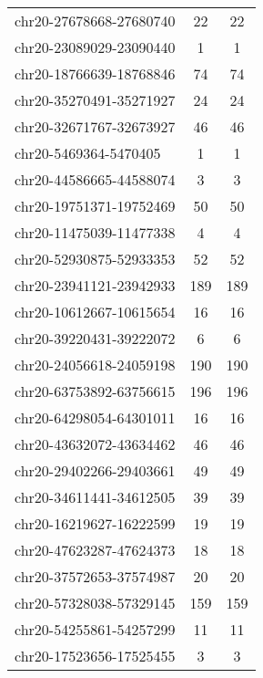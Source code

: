 \begin{longtable}{lSS}
	chr20-27678668-27680740 & 22     & 22                         \\
	chr20-23089029-23090440 & 1      & 1                          \\
	chr20-18766639-18768846 & 74     & 74                         \\
	chr20-35270491-35271927 & 24     & 24                         \\
	chr20-32671767-32673927 & 46     & 46                         \\
	chr20-5469364-5470405   & 1      & 1                          \\
	chr20-44586665-44588074 & 3      & 3                          \\
	chr20-19751371-19752469 & 50     & 50                         \\
	chr20-11475039-11477338 & 4      & 4                          \\
	chr20-52930875-52933353 & 52     & 52                         \\
	chr20-23941121-23942933 & 189    & 189                        \\
	chr20-10612667-10615654 & 16     & 16                         \\
	chr20-39220431-39222072 & 6      & 6                          \\
	chr20-24056618-24059198 & 190    & 190                        \\
	chr20-63753892-63756615 & 196    & 196                        \\
	chr20-64298054-64301011 & 16     & 16                         \\
	chr20-43632072-43634462 & 46     & 46                         \\
	chr20-29402266-29403661 & 49     & 49                         \\
	chr20-34611441-34612505 & 39     & 39                         \\
	chr20-16219627-16222599 & 19     & 19                         \\
	chr20-47623287-47624373 & 18     & 18                         \\
	chr20-37572653-37574987 & 20     & 20                         \\
	chr20-57328038-57329145 & 159    & 159                        \\
	chr20-54255861-54257299 & 11     & 11                         \\
	chr20-17523656-17525455 & 3      & 3                          \\

\end{longtable}
